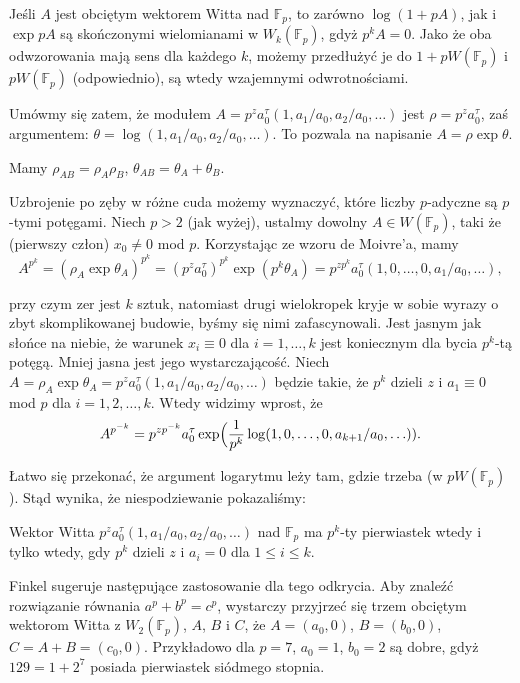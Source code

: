 Jeśli $A$ jest obciętym wektorem Witta nad $\mathbb F_p$, to zarówno $\log (1 + pA)$, jak i $\exp pA$ są skończonymi wielomianami w $W_k(\mathbb F_p)$, gdyż $p^k A = 0$.
Jako że oba odwzorowania mają sens dla każdego $k$, możemy przedłużyć je do $1 + pW(\mathbb F_p)$ i $pW(\mathbb F_p)$ (odpowiednio), są wtedy wzajemnymi odwrotnościami.

Umówmy się zatem, że modułem $A = p^z a_0^\tau(1, a_1/a_0, a_2/a_0, \ldots)$ jest $\rho = p^z a_0^\tau$, zaś argumentem: $\theta = \log(1, a_1/a_0, a_2/a_0, \ldots)$.
To pozwala na napisanie $A = \rho \exp \theta$.

\begin{fakt}
	Mamy $\rho_{AB} = \rho_A \rho_B$, $\theta_{AB} = \theta_A+\theta_B$.
\end{fakt}

Uzbrojenie po zęby w różne cuda możemy wyznaczyć, które liczby $p$-adyczne są $p$-tymi potęgami.
Niech $p > 2$ (jak wyżej), ustalmy dowolny $A \in W(\mathbb F_p)$, taki że (pierwszy człon) $x_0 \neq 0$ mod $p$.
Korzystając ze wzoru de Moivre'a, mamy
\[
	A^{p^k} = (\rho_A \exp \theta_A)^{p^k} = (p^z a_0^\tau)^{p^k} \exp (p^k \theta_A) = p^{zp^k} a_0^\tau (1, 0, \ldots, 0, a_1/a_0, \ldots),
\]

przy czym zer jest $k$ sztuk, natomiast drugi wielokropek kryje w sobie wyrazy o zbyt skomplikowanej budowie, byśmy się nimi zafascynowali.
Jest jasnym jak słońce na niebie, że warunek $x_i \equiv 0$ dla $i = 1, \ldots, k$ jest koniecznym dla bycia $p^k$-tą potęgą.
Mniej jasna jest jego wystarczającość.
Niech $A = \rho_A \exp \theta_A = p^z a_0^\tau(1, a_1/a_0, a_2/a_0, \ldots)$ będzie takie, że $p^k$ dzieli $z$ i $a_1 \equiv 0$ mod $p$ dla $i = 1, 2, \ldots, k$.
Wtedy widzimy wprost, że
\[
	A^{p^{-k}} = p^{zp^{-k}} a_0^\tau \exp \Bigl(\frac{1}{p^k} \log(1, 0, \ldots, 0, a_{k+1}/a_0, \ldots)).
\]

Łatwo się przekonać, że argument logarytmu leży tam, gdzie trzeba (w $pW(\mathbb F_p)$).
Stąd wynika, że niespodziewanie pokazaliśmy:

\begin{fakt}
	Wektor Witta $p^z a_0^\tau(1, a_1/a_0, a_2/a_0, \ldots)$ nad $\mathbb F_p$ ma $p^k$-ty pierwiastek wtedy i tylko wtedy, gdy $p^k$ dzieli $z$ i $a_i = 0$ dla $1 \le i \le k$.
\end{fakt}

Finkel sugeruje następujące zastosowanie dla tego odkrycia.
Aby znaleźć rozwiązanie równania $a^p + b^p = c^p$, wystarczy przyjrzeć się trzem obciętym wektorom Witta z $W_2(\mathbb F_p)$, $A$, $B$ i $C$, że $A = (a_0, 0)$, $B = (b_0, 0)$, $C = A+B = (c_0, 0)$.
Przykładowo dla $p = 7$, $a_0 = 1$, $b_0 = 2$ są dobre, gdyż $129 = 1 + 2^7$ posiada pierwiastek siódmego stopnia.